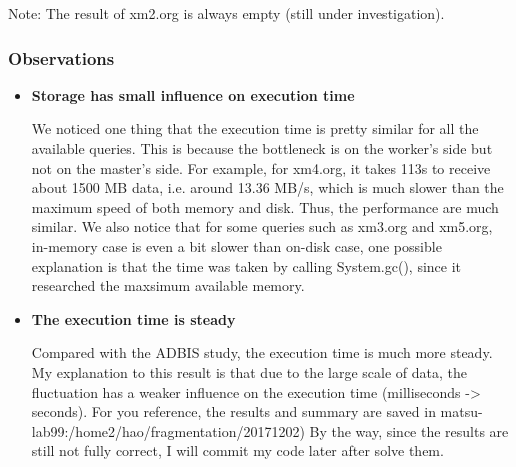 Note: The result of xm2.org is always empty (still under investigation).


\subsubsection{Observations}

\begin{itemize}
\item \textbf{Storage has small influence on execution time}
 
 We noticed one thing that the execution time is pretty similar for
 all the available queries. This is because the bottleneck is on the
 worker's side but not on the master's side. For example, for xm4.org,
 it takes 113s to receive about 1500 MB data, i.e. around 13.36 MB/s, 
 which is much slower than the maximum speed of both memory and disk. 
 Thus, the performance are much similar. We also notice that for some
 queries such as xm3.org and xm5.org, in-memory case is even a bit 
 slower than on-disk case, one possible explanation is that the time 
 was taken by calling System.gc(), since it researched the maxsimum 
 available memory.
 
\item \textbf{The execution time is steady}
 
 Compared with the ADBIS study, the execution time is much more
 steady. My explanation to this result is that due to the large scale
 of data, the fluctuation has a weaker influence on the execution
 time (milliseconds -> seconds). For you reference, the results and
 summary are saved in matsu-lab99:/home2/hao/fragmentation/20171202)
 By the way, since the results are still not fully correct, I will
 commit my code later after solve them.
\end{itemize}


 
